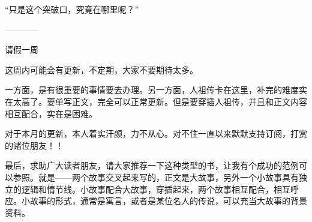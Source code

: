 \begin{this_body}
“只是这个突破口，究竟在哪里呢？”

------------

请假一周

这周内可能会有更新，不定期，大家不要期待太多。

一方面，是有很重要的事情要去办理。另一方面，人祖传卡在这里，补完的难度实在太高了。要单写正文，完全可以正常更新。但是要穿插人祖传，并且和正文内容相互配合，实在是困难。

对于本月的更新，本人着实汗颜，力不从心。对不住一直以来默默支持订阅，打赏的诸位朋友！！

最后，求助广大读者朋友，请大家推荐一下这种类型的书，让我有个成功的范例可以参照。就是——两个故事交叉起来写的，正文是大故事，另外一个小故事具有独立的逻辑和情节线。小故事配合大故事，穿插起来，两个故事相互配合，相互呼应。小故事的形式，通常是寓言，或者是某位名人的传说，可以充当大故事的背景资料。

\end{this_body}

